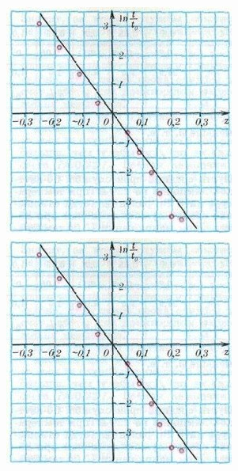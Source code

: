 
\fancyfoot[R]{\Huge \thepage} %

\setcounter{page}{5} %
\setcounter{figure}{2} %
\setcounter{table}{1} %

    \begin{figure}[ht]
        \centering
        \begin{minipage}[t]{0.45\textwidth}
            \centering
            \includegraphics[width=\linewidth]{images/pict2.jpg}
            \caption{}
        \end{minipage}
        \hfill
        \begin{minipage}[t]{0.45\textwidth}
            \centering
            \includegraphics[width=\linewidth]{images/pict2.jpg}

\end{minipage}
\end{figure}
